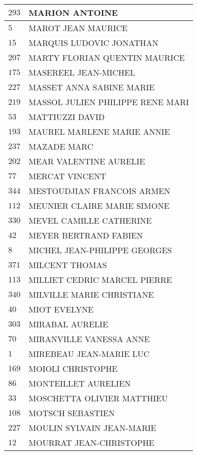 \begin{xltabular}{\linewidth}{|l|X|}
    \hline
    $293$ & MARION ANTOINE \\
    \hline
    $5$ & MAROT JEAN MAURICE \\
    \hline
    $15$ & MARQUIS LUDOVIC JONATHAN \\
    \hline
    $207$ & MARTY FLORIAN QUENTIN MAURICE \\
    \hline
    $175$ & MASEREEL JEAN-MICHEL \\
    \hline
    $227$ & MASSET ANNA SABINE MARIE \\
    \hline
    $219$ & MASSOL JULIEN PHILIPPE RENE MARI \\
    \hline
    $53$ & MATTIUZZI DAVID \\
    \hline
    $193$ & MAUREL MARLENE MARIE ANNIE \\
    \hline
    $237$ & MAZADE MARC \\
    \hline
    $202$ & MEAR VALENTINE AURELIE \\
    \hline
    $77$ & MERCAT VINCENT \\
    \hline
    $344$ & MESTOUDJIAN FRANCOIS ARMEN \\
    \hline
    $112$ & MEUNIER CLAIRE MARIE SIMONE \\
    \hline
    $330$ & MEVEL CAMILLE CATHERINE \\
    \hline
    $42$ & MEYER BERTRAND FABIEN \\
    \hline
    $8$ & MICHEL JEAN-PHILIPPE GEORGES \\
    \hline
    $371$ & MILCENT THOMAS \\
    \hline
    $113$ & MILLIET CEDRIC MARCEL PIERRE \\
    \hline
    $340$ & MILVILLE MARIE CHRISTIANE \\
    \hline
    $40$ & MIOT EVELYNE \\
    \hline
    $303$ & MIRABAL AURELIE \\
    \hline
    $70$ & MIRANVILLE VANESSA ANNE \\
    \hline
    $1$ & MIREBEAU JEAN-MARIE LUC \\
    \hline
    $169$ & MOIOLI CHRISTOPHE \\
    \hline
    $86$ & MONTEILLET AURELIEN \\
    \hline
    $33$ & MOSCHETTA OLIVIER MATTHIEU \\
    \hline
    $108$ & MOTSCH SEBASTIEN \\
    \hline
    $227$ & MOULIN SYLVAIN JEAN-MARIE \\
    \hline
    $12$ & MOURRAT JEAN-CHRISTOPHE \\

\end{xltabular}
